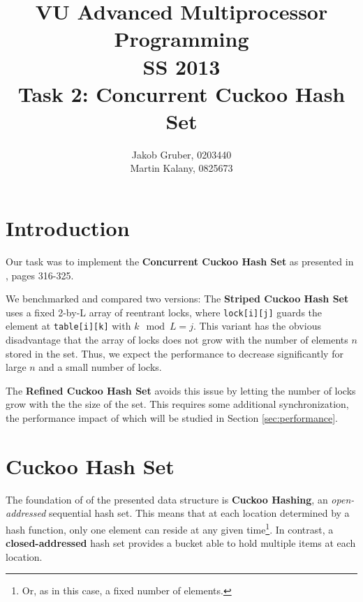 \documentclass[a4paper,10pt]{article}
\title{VU Advanced Multiprocessor Programming \\
       SS 2013 \\
       Task 2: Concurrent Cuckoo Hash Set}
\author{Jakob Gruber, 0203440 \\
        Martin Kalany, 0825673}
\begin{document}
\maketitle

\begin{comment}
* Good theoretical analysis (invariants, linearizability, progress guarantees).
* Good benchmark analysis.
* Short document: 2-4 pages excluding plots and sourcecode. Description of data
  structure. Theoretical analysis. Benchmark (results, process).

+The Go implementation doesn't need either of these crutches. It's also designed
+to work without reentrant locks and thread ids.

TODO:
- which variant performs better when?
- asymptotic behaviour
- where is the cross-over point?
- anything unexpected?
\end{comment}

\section{Introduction}

Our task was to implement the \textbf{Concurrent Cuckoo Hash Set} as presented
in \cite{herlihy}, pages 316-325. 

We benchmarked and compared two versions: The \textbf{Striped Cuckoo Hash Set}
uses a fixed 2-by-L array of reentrant locks, where \lstinline|lock[i][j]|
guards the element at \lstinline|table[i][k]| with $k \mod L = j$. This variant
has the obvious disadvantage that the array of locks does not grow with the
number of elements $n$ stored in the set. Thus, we expect the performance to
decrease significantly for large $n$ and a small number of locks.

The \textbf{Refined Cuckoo Hash Set} avoids this issue by letting the number of
locks grow with the the size of the set. This requires some additional
synchronization, the performance impact of which will be studied in Section
\ref{sec:performance}.

\section{Cuckoo Hash Set}

The foundation of of the presented data structure is \textbf{Cuckoo Hashing},
an \textit{open-addressed} sequential hash set. This means that at each
location determined by a hash function, only one element can reside at any
given time\footnote{Or, as in this case, a fixed number of elements.}. In
contrast, a \textbf{closed-addressed} hash set provides a bucket able to hold
multiple items at each location.
\end{document}
